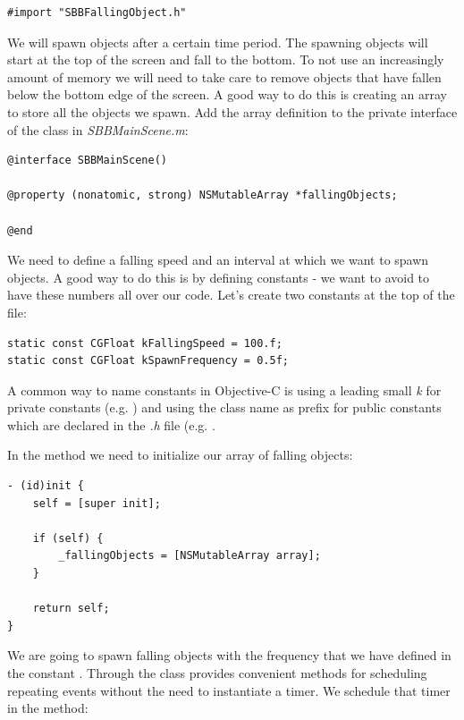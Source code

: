 \begin{lstlisting}
#import "SBBFallingObject.h"
\end{lstlisting}

We will spawn objects after a certain time period. The spawning objects will
start at the top of the screen and fall to the bottom. To not use an
increasingly amount of memory we will need to take care to remove objects that
have fallen below the bottom edge of the screen. A good way to do this is
creating an array to store all the objects we spawn. Add the array definition to
the private interface of the class in \textit{SBBMainScene.m}:

\begin{lstlisting}
@interface SBBMainScene()

@property (nonatomic, strong) NSMutableArray *fallingObjects;

@end
\end{lstlisting}

We need to define a falling speed and an interval at which we want to spawn
objects. A good way to do this is by defining constants - we want to avoid to
have these numbers all over our code. Let's create two constants at the top of
the file:

\begin{lstlisting}
static const CGFloat kFallingSpeed = 100.f;
static const CGFloat kSpawnFrequency = 0.5f;
\end{lstlisting}

\begin{details}[frametitle={Naming constants in Objective-C}] A common way to
name constants in Objective-C is using a leading small \textit{k}
for private constants (e.g. ) and using the class name
as prefix for public constants which are declared in the \textit{.h} file (e.g.
.
\end{details}

In the  method we need to initialize our array of falling
objects:

\begin{lstlisting}
- (id)init {
    self = [super init];
    
    if (self) {
        _fallingObjects = [NSMutableArray array];
    }
    
    return self;
}
\end{lstlisting}

We are going to spawn falling objects with the frequency that we have defined in
the constant . Through the  class
\cocos{} provides convenient methods for scheduling repeating events without the
need to instantiate a timer. We schedule that timer in the
 method:

